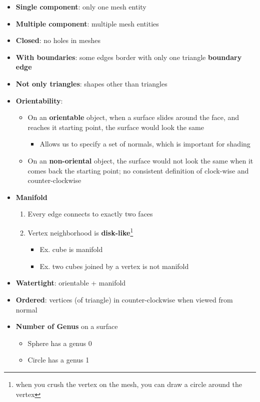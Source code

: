   \begin{itemize}
    \item \textbf{Single component}: only one mesh entity
    \item \textbf{Multiple component}: multiple mesh entities
    \item \textbf{Closed}: no holes in meshes
    \item \textbf{With boundaries}: some edges border with only one triangle
    \textbf{boundary edge}
    \item \textbf{Not only triangles}: shapes other than triangles
    \item \textbf{Orientability}:
    \begin{itemize}
      \item On an \textbf{orientable} object, when a surface slides around the
      face, and reaches it starting point, the surface would look the same
      \begin{itemize}
        \item Allows us to specify a set of normals, which is important for
        shading
      \end{itemize}

      \item On an \textbf{non-oriental} object, the surface would not
      look the same when it comes back the starting point; no consistent
      definition of clock-wise and counter-clockwise
    \end{itemize}

    \item \textbf{Manifold}
    \begin{enumerate}
      \item Every edge connects to exactly two faces
      \item Vertex neighborhood is \textbf{disk-like}\footnote{when
      you crush the vertex on the mesh, you can draw a circle around the
      vertex}
      \begin{itemize}
        \item Ex. cube is manifold
        \item Ex. two cubes joined by a vertex is not manifold
      \end{itemize}
    \end{enumerate}

    \item \textbf{Watertight}: orientable + manifold
    \item \textbf{Ordered}: vertices (of triangle) in counter-clockwise
    when viewed from normal
    \item \textbf{Number of Genus} on a surface
    \begin{itemize}
      \item Sphere has a genus 0
      \item Circle has a genus 1
    \end{itemize}
  \end{itemize}

